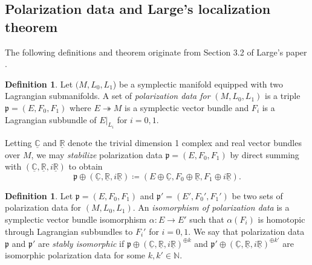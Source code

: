 \documentclass[11pt]{amsart}
\theoremstyle{definition}
\newtheorem{definition}[theorem]{Definition}
\theoremstyle{remark}
\def\N{\mathbb{N}}
\def\C{\mathbb{C}}
\def\R{\mathbb{R}}
\numberwithin{equation}{section}
\begin{document}
\subsection{Polarization data and Large's localization theorem}\label{localization}
The following definitions and theorem originate from Section 3.2 of Large's paper \cite{Large}.
\begin{definition}
Let $(M,L_0,L_1$) be a symplectic manifold equipped with two Lagrangian submanifolds.
A set of \emph{polarization data for} $(M, L_0, L_1)$ is a triple $\mathfrak{p} = (E, F_0, F_1)$ where $E\twoheadrightarrow M$ is a symplectic vector bundle and $F_i$ is a Lagrangian subbundle of $E|_{L_i}$ for $i = 0, 1.$
\end{definition}
Letting $\underline{\C}$ and $\underline{\R}$ denote the trivial dimension 1 complex and real vector bundles over $M$, we may \emph{stabilize} polarization data $\mathfrak{p}=(E,F_0,F_1)$ by direct summing with $(\underline{\C},\underline{\R},i\underline{\R})$ to obtain \[\mathfrak{p}\oplus (\underline{\C},\underline{\R},i\underline{\R})\coloneq (E\oplus \underline{\C},F_0\oplus \underline{\R},F_1\oplus i\underline{\R}).\]
\begin{definition}\label{isopol}
    Let $\mathfrak{p}=(E,F_0,F_1)$ and $\mathfrak{p}'=(E',F_0',F_1')$ be two sets of polarization data for $(M,L_0,L_1)$. An \emph{isomorphism of polarization data} is a symplectic vector bundle isomorphism $\alpha\colon E\to E'$ such that $\alpha(F_i)$ is homotopic through Lagrangian subbundles to $F_i'$ for $i=0,1.$ We say that polarization data $\mathfrak{p}$ and $\mathfrak{p}'$ are \emph{stably isomorphic} if $\mathfrak{p}\oplus (\underline{\C},\underline{\R},i\underline{\R})^{\oplus k}$ and $\mathfrak{p}'\oplus (\underline{\C},\underline{\R},i\underline{\R})^{\oplus k'}$ are isomorphic polarization data for some $k,k'\in \N.$
\end{definition}
\end{document}
